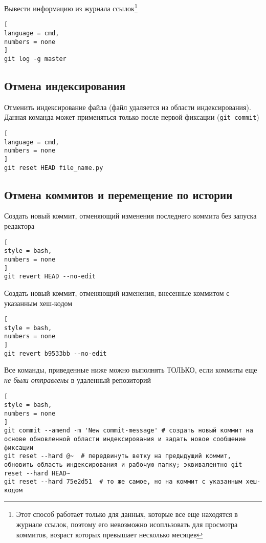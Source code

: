 \documentclass[%
	11pt,
	a4paper,
	utf8,
		]{article}
\begin{document}
Вывести информацию из журнала ссылок\footnote{Этот способ работает только для данных, которые все еще находятся в журнале ссылок, поэтому его невозможно исопльзовать для просмотра коммитов, возраст которых превышает несколько месяцев}

\begin{lstlisting}[
language = cmd,
numbers = none
]
git log -g master
\end{lstlisting}


\subsection{Отмена индексирования}

Отменить индексирование файла (файл удаляется из области индексирования). Данная команда может применяться только после первой фиксации (\texttt{git commit})

\begin{lstlisting}[
language = cmd,
numbers = none
]
git reset HEAD file_name.py
\end{lstlisting}

\subsection{Отмена коммитов и перемещение по истории}


Создать новый коммит, отменяющий изменения последнего коммита без запуска редактора
\begin{lstlisting}[
style = bash,
numbers = none
]
git revert HEAD --no-edit
\end{lstlisting}

Создать новый коммит, отменяющий изменения, внесенные коммитом с указанным хеш-кодом
\begin{lstlisting}[
style = bash,
numbers = none
]
git revert b9533bb --no-edit
\end{lstlisting}

Все команды, приведенные ниже можно выполнять ТОЛЬКО, если коммиты еще \emph{не были отправлены} в удаленный репозиторий
\begin{lstlisting}[
style = bash,
numbers = none
]
git commit --amend -m 'New commit-message' # создать новый коммит на основе обновленной области индексирования и задать новое сообщение фиксации
git reset --hard @~  # передвинуть ветку на предыдущий коммит, обновить область индексирования и рабочую папку; эквивалентно git reset --hard HEAD~
git reset --hard 75e2d51  # то же самое, но на коммит с указанным хеш-кодом
\end{lstlisting}
\end{document}
